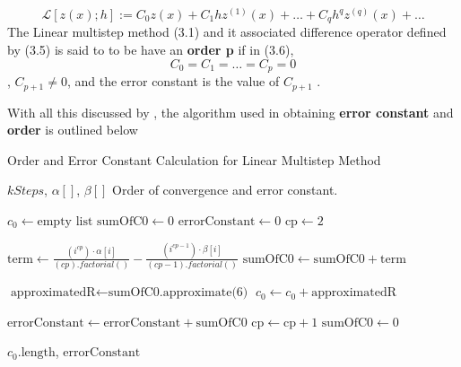\begin{equation}
   \mathcal{L}[z(x);h] := C_0z(x)+ C_1hz^{(1)}(x)+ \dots + C_qh^qz^{(q)}(x)+ \dots
\end{equation}
The Linear multistep method (3.1) and it associated difference operator defined by (3.5) is said to to be have an \textbf{order p} if in (3.6), \[C_0 = C_1 = \dots = C_p = 0 \], $C_{p+1} \neq 0$, and the error constant is the value of $C_{p+1}$ \cite{lambert1977}.

With all this discussed by \cite{lambert1977}, the algorithm used in obtaining \textbf{error constant} and \textbf{order} is outlined below

\begin{algorithm}
   \caption{Order and Error Constant Calculation for Linear Multistep Method}
   \label{alg:order_error_constant}
   
   \begin{algorithmic}
   \REQUIRE \(kSteps\), \( \alpha[] \), \( \beta[] \) 
   \ENSURE Order of convergence and error constant.
   
   \STATE \( c_0 \gets \text{empty list} \) 
   \STATE \( \text{sumOfC0} \gets 0 \)
   \STATE \( \text{errorConstant} \gets 0 \)
   \STATE \( \text{cp} \gets 2 \) %
   
           \STATE \( \text{term} \gets \frac{(i^{cp}) \cdot \alpha[i]}{(cp).factorial()} - \frac{(i^{cp - 1}) \cdot \beta[i]}{(cp - 1).factorial()} \) 
           \STATE \( \text{sumOfC0} \gets \text{sumOfC0} + \text{term} \)
           
               \STATE \( \text{approximatedR} \gets \text{sumOfC0.approximate(6)} \)
               \STATE \( c_0 \gets c_0 + \text{approximatedR} \)
           \ENDIF
       \ENDFOR
       
           \STATE \( \text{errorConstant} \gets \text{errorConstant} + \text{sumOfC0} \)
               \STATE \( \text{cp} \gets \text{cp} + 1 \) 
               \STATE \( \text{sumOfC0} \gets 0 \)
               \STATE {}
           \ENDIF
           \STATE {} %
       \ELSE
           \STATE {}
       \ENDIF
       
   \ENDWHILE
   
   \RETURN \( c_0.\text{length} \), \( \text{errorConstant} \)
   
   \end{algorithmic}
   \end{algorithm}


